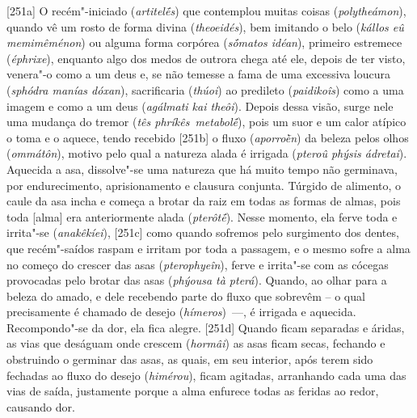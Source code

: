 [251a] O recém"-iniciado (\emph{artitelḗs}) que contemplou muitas
coisas (\emph{polytheámon}), quando vê um rosto de forma divina
(\emph{theoeidés}), bem imitando o belo (\emph{kállos eû memimêménon})
ou alguma forma corpórea (\emph{sṓmatos idéan}), primeiro estremece
(\emph{éphrixe}), enquanto algo dos medos de outrora chega até ele,
depois de ter visto, venera"-o como a um deus e, se não temesse a fama de
uma excessiva loucura (\emph{sphódra manías dóxan}), sacrificaria
(\emph{thúoi}) ao predileto (\emph{paidikoîs}) como a uma imagem e como
a um deus (\emph{agálmati kai theôi}). Depois dessa visão, surge nele
uma mudança do tremor (\emph{tês phríkês}~\emph{metabolḗ}), pois um suor
e um calor atípico o toma e o aquece, tendo recebido [251b] o fluxo
(\emph{aporroḕn}) da beleza pelos olhos (\emph{ommátôn}), motivo pelo
qual a natureza alada é irrigada (\emph{pteroû phýsis ádretai}).
Aquecida a asa, dissolve"-se uma natureza que há muito tempo não
germinava, por endurecimento, aprisionamento e clausura conjunta.
Túrgido de alimento, o caule da asa incha e começa a brotar da raiz em
todas as formas de almas, pois toda [alma] era anteriormente alada
(\emph{pterôtḗ}). Nesse momento, ela ferve toda e irrita"-se
(\emph{anakêkíei}), [251c] como quando sofremos pelo surgimento dos
dentes, que recém"-saídos raspam e irritam por toda a passagem, e o mesmo
sofre a alma no começo do crescer das asas (\emph{pterophyeîn}), ferve e
irrita"-se com as cócegas provocadas pelo brotar das asas (\emph{phýousa
tà pterá}). Quando, ao olhar para a beleza do amado, e dele recebendo
parte do fluxo que sobrevêm -- o qual precisamente é chamado de desejo
(\emph{hímeros})~\mbox{---,} é irrigada e aquecida. Recompondo"-se da dor, ela
fica alegre. [251d] Quando ficam separadas e áridas, as vias que
deságuam onde crescem (\emph{hormâi}) as asas ficam secas, fechando e
obstruindo o germinar das asas, as quais, em seu interior, após terem
sido fechadas ao fluxo do desejo (\emph{himérou}), ficam agitadas,
arranhando cada uma das vias de saída, justamente porque a alma enfurece
todas as feridas ao redor, causando dor.

